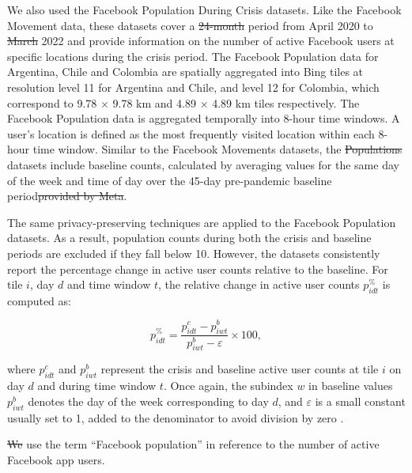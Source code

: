 \documentclass[fleqn,10pt]{wlscirep}
\providecommand{\DIFadd}[1]{{\protect\color{blue}\uwave{#1}}} %
\providecommand{\DIFdel}[1]{{\protect\color{red}\sout{#1}}}                      %
\providecommand{\DIFaddbegin}{} %
\providecommand{\DIFaddend}{} %
\providecommand{\DIFdelbegin}{} %
\providecommand{\DIFdelend}{} %
\begin{document}
We also used the Facebook Population During Crisis datasets. Like the Facebook Movement data, these datasets cover a \DIFdelbegin \DIFdel{24-month }\DIFdelend \DIFaddbegin \DIFadd{26-month }\DIFaddend period from April 2020 to \DIFdelbegin \DIFdel{March }\DIFdelend \DIFaddbegin \DIFadd{May }\DIFaddend 2022 and provide information on the number of active Facebook users at specific locations during the crisis period. The Facebook Population data for Argentina, Chile and Colombia are spatially aggregated into Bing tiles at resolution level 11 for Argentina and Chile, and level 12 for Colombia, which correspond to 9.78 $\times$ 9.78 km and 4.89 $\times$ 4.89 km tiles respectively. The Facebook Population data is aggregated temporally into 8-hour time windows. A user's location is defined as the most frequently visited location within each 8-hour time window.
Similar to the Facebook Movements datasets, the \DIFdelbegin \DIFdel{Populations }\DIFdelend \DIFaddbegin \DIFadd{Population }\DIFaddend datasets include baseline counts, calculated by averaging values for the same day of the week and time of day over the 45-day pre-pandemic baseline period\DIFdelbegin \DIFdel{provided by Meta}\DIFdelend .

The same privacy-preserving techniques are applied to the Facebook Population datasets.
As a result, population counts during both the crisis and baseline periods are excluded if they fall below 10. However, the datasets consistently report the percentage change in active user counts relative to the baseline. For tile $i$, day $d$ and time window $t$, the relative change in active user counts $p^{\%}_{idt}$ is computed as:

\begin{equation}
   p^{\%}_{idt} = \dfrac{p^{c}_{idt} - p^b_{iwt}}{p^b_{iwt} - \varepsilon}\times 100, 
\end{equation}

where $p^c_{idt}$ and $p^b_{iwt}$ represent the crisis and baseline active user counts at tile $i$ on day $d$ and during time window $t$. Once again, the subindex $w$ in baseline values $p^b_{iwt}$ denotes the day of the week corresponding to day $d$, and $\varepsilon$ is a small constant usually set to 1, added to the denominator to avoid division by zero \cite{Maas19}. \DIFdelbegin %

\DIFdel{We }\DIFdelend \DIFaddbegin \DIFadd{Through the paper, we }\DIFaddend use the term ``Facebook population'' in reference to the number of active Facebook app users.
\end{document}
